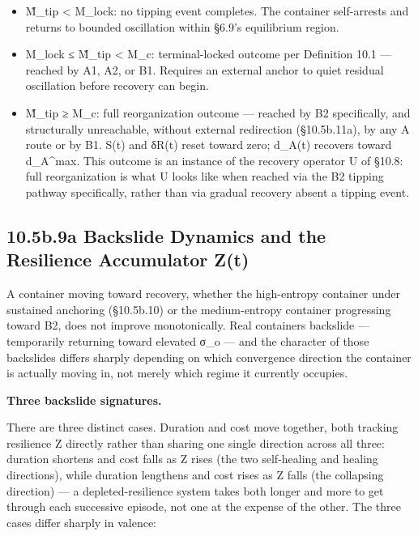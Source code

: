 \documentclass[
]{article}
\begin{document}
\begin{itemize}
\item
  M̃\_tip \textless{} M\_lock: no tipping event completes. The container
  self-arrests and returns to bounded oscillation within §6.9's
  equilibrium region.
\item
  M\_lock ≤ M̃\_tip \textless{} M\_c: terminal-locked outcome per
  Definition 10.1 --- reached by A1, A2, or B1. Requires an external
  anchor to quiet residual oscillation before recovery can begin.
\item
  M̃\_tip ≥ M\_c: full reorganization outcome --- reached by B2
  specifically, and structurally unreachable, without external
  redirection (§10.5b.11a), by any A route or by B1. S(t) and δR(t)
  reset toward zero; d\_A(t) recovers toward d\_A\^{}max. This outcome
  is an instance of the recovery operator U of §10.8: full
  reorganization is what U looks like when reached via the B2 tipping
  pathway specifically, rather than via gradual recovery absent a
  tipping event.
\end{itemize}

\hypertarget{b.9a-backslide-dynamics-and-the-resilience-accumulator-zt}{%
\subsection{10.5b.9a Backslide Dynamics and the Resilience Accumulator
Z(t)}\label{b.9a-backslide-dynamics-and-the-resilience-accumulator-zt}}

A container moving toward recovery, whether the high-entropy container
under sustained anchoring (§10.5b.10) or the medium-entropy container
progressing toward B2, does not improve monotonically. Real containers
backslide --- temporarily returning toward elevated σ\_o --- and the
character of those backslides differs sharply depending on which
convergence direction the container is actually moving in, not merely
which regime it currently occupies.

\textbf{Three backslide signatures.}

There are three distinct cases. Duration and cost move together, both
tracking resilience Z directly rather than sharing one single direction
across all three: duration shortens and cost falls as Z rises (the two
self-healing and healing directions), while duration lengthens and cost
rises as Z falls (the collapsing direction) --- a depleted-resilience
system takes both longer and more to get through each successive
episode, not one at the expense of the other. The three cases differ
sharply in valence:
\end{document}
